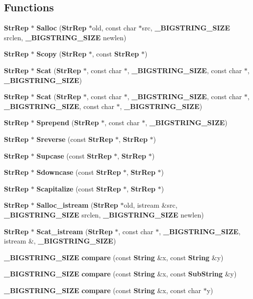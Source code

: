 \subsection*{Functions}
\begin{CompactItemize}
\item 
{\bf Str\-Rep} $\ast$ {\bf Salloc} ({\bf Str\-Rep} $\ast$old, const char $\ast$src, {\bf \_\-BIGSTRING\_\-SIZE} srclen, {\bf \_\-BIGSTRING\_\-SIZE} newlen)
\item 
{\bf Str\-Rep} $\ast$ {\bf Scopy} ({\bf Str\-Rep} $\ast$, const {\bf Str\-Rep} $\ast$)
\item 
{\bf Str\-Rep} $\ast$ {\bf Scat} ({\bf Str\-Rep} $\ast$, const char $\ast$, {\bf \_\-BIGSTRING\_\-SIZE}, const char $\ast$, {\bf \_\-BIGSTRING\_\-SIZE})
\item 
{\bf Str\-Rep} $\ast$ {\bf Scat} ({\bf Str\-Rep} $\ast$, const char $\ast$, {\bf \_\-BIGSTRING\_\-SIZE}, const char $\ast$, {\bf \_\-BIGSTRING\_\-SIZE}, const char $\ast$, {\bf \_\-BIGSTRING\_\-SIZE})
\item 
{\bf Str\-Rep} $\ast$ {\bf Sprepend} ({\bf Str\-Rep} $\ast$, const char $\ast$, {\bf \_\-BIGSTRING\_\-SIZE})
\item 
{\bf Str\-Rep} $\ast$ {\bf Sreverse} (const {\bf Str\-Rep} $\ast$, {\bf Str\-Rep} $\ast$)
\item 
{\bf Str\-Rep} $\ast$ {\bf Supcase} (const {\bf Str\-Rep} $\ast$, {\bf Str\-Rep} $\ast$)
\item 
{\bf Str\-Rep} $\ast$ {\bf Sdowncase} (const {\bf Str\-Rep} $\ast$, {\bf Str\-Rep} $\ast$)
\item 
{\bf Str\-Rep} $\ast$ {\bf Scapitalize} (const {\bf Str\-Rep} $\ast$, {\bf Str\-Rep} $\ast$)
\item 
{\bf Str\-Rep} $\ast$ {\bf Salloc\_\-istream} ({\bf Str\-Rep} $\ast$old, istream \&src, {\bf \_\-BIGSTRING\_\-SIZE} srclen, {\bf \_\-BIGSTRING\_\-SIZE} newlen)
\item 
{\bf Str\-Rep} $\ast$ {\bf Scat\_\-istream} ({\bf Str\-Rep} $\ast$, const char $\ast$, {\bf \_\-BIGSTRING\_\-SIZE}, istream \&, {\bf \_\-BIGSTRING\_\-SIZE})
\item 
{\bf \_\-BIGSTRING\_\-SIZE} {\bf compare} (const {\bf String} \&x, const {\bf String} \&y)
\item 
{\bf \_\-BIGSTRING\_\-SIZE} {\bf compare} (const {\bf String} \&x, const {\bf Sub\-String} \&y)
\item 
{\bf \_\-BIGSTRING\_\-SIZE} {\bf compare} (const {\bf String} \&x, const char $\ast$y)
\item 

\end{CompactItemize}
